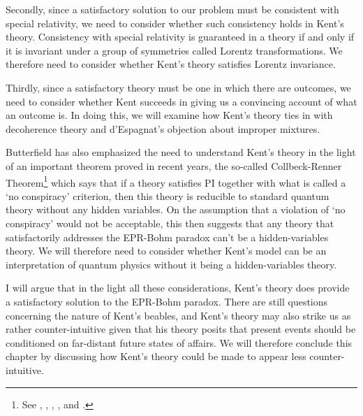 Secondly, since a satisfactory solution to our problem must be consistent with special relativity, we need to consider whether such consistency holds in Kent's theory. Consistency with special relativity is guaranteed in a theory if and only if it is invariant under a group of symmetries called Lorentz transformations. We therefore need to consider whether Kent's theory satisfies Lorentz invariance. 

Thirdly, since a satisfactory theory must be one in which there are outcomes, we need to consider whether Kent succeeds in giving us a convincing account of what an outcome is. In doing this, we will examine how Kent's theory ties in with decoherence theory and d'Espagnat's objection about improper mixtures.

Butterfield has also emphasized the need to understand Kent's theory in the light of an important theorem proved in recent years, the so-called Collbeck-Renner Theorem\footnote{See \cite{LeegwaterGijs2016Aitf}, \cite{ColbeckRoger2011Neoq}, \cite{ColbeckRoger2012Tcoq}, \cite{LandsmanK2015OtCt}, and \cite{Landsman}.} which says that if a theory satisfies PI together with what is called a `no conspiracy' criterion, then this theory is reducible to standard quantum theory without any hidden variables. On the assumption that a violation of `no conspiracy' would not be acceptable,  this then suggests that any theory that satisfactorily addresses the  EPR-Bohm paradox can't be a hidden-variables theory. We will therefore need to consider whether Kent's model can be an interpretation of quantum physics without it being a hidden-variables theory.

I will argue that in the light all these considerations, Kent's theory does provide a satisfactory solution to the EPR-Bohm paradox. There are still questions concerning the nature of Kent's beables, and Kent's theory may also strike us as rather counter-intuitive given that his theory posits that present events should be conditioned on far-distant future states of affairs. We will therefore conclude this chapter by discussing how Kent's theory could be made to appear less counter-intuitive.

